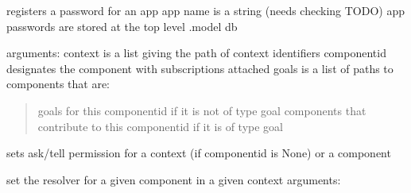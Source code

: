 \documentclass[letterpaper,10pt,english]{sphinxmanual}
\begin{document}
\begin{fulllineitems}
\begin{fulllineitems}
\begin{description}
\end{description}

\end{fulllineitems}


\begin{fulllineitems}
\label{personis.client:personis.client.Access.registerapp}
registers a password for an app
app name is a string (needs checking TODO)
app passwords are stored at the top level .model db

\end{fulllineitems}


\begin{fulllineitems}
\label{personis.client:personis.client.Access.set_goals}
arguments:
context is a list giving the path of context identifiers
componentid designates the component with subscriptions attached
goals is a list of paths to components that are:
\begin{quote}

goals for this componentid if it is not of type goal
components that contribute to this componentid if it is of type goal
\end{quote}

\end{fulllineitems}


\begin{fulllineitems}
\label{personis.client:personis.client.Access.setpermission}
sets ask/tell permission for a context (if componentid is None) or
a component

\end{fulllineitems}


\begin{fulllineitems}
\label{personis.client:personis.client.Access.setresolver}
set the resolver for a given component in a given context
arguments:
\begin{quote}


\end{quote}
\end{fulllineitems}
\end{fulllineitems}
\end{document}
